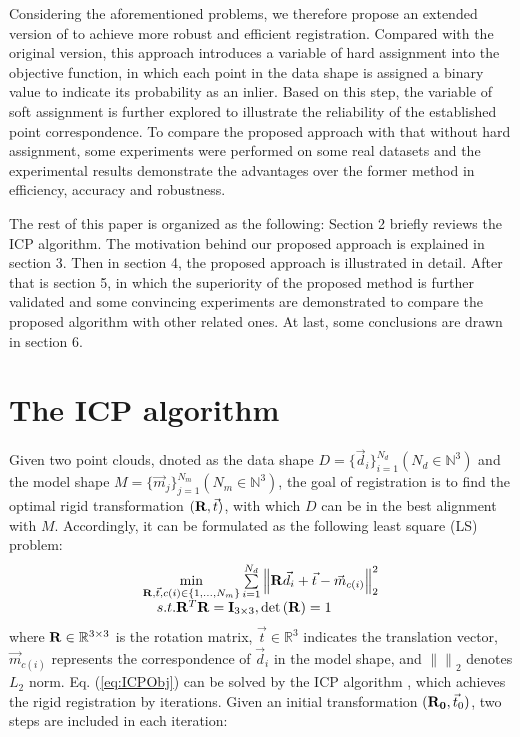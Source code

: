 \documentclass[review]{elsarticle}
\begin{document}
Considering the aforementioned problems, we therefore propose an extended version of \cite{Zhu16} to achieve more robust and efficient registration. Compared with the original version, this approach introduces a variable of hard assignment into the objective function, in which each point in the data shape is assigned a binary value to indicate its probability as an inlier. Based on this step, the variable of soft assignment is further explored to illustrate the reliability of the established point correspondence. To compare the proposed approach with that without hard assignment, some experiments were performed on some real datasets and the experimental results demonstrate the advantages over the former method in efficiency, accuracy and robustness.

The rest of this paper is organized as the following: Section 2 briefly reviews the ICP algorithm. The motivation behind our proposed approach is explained in section 3.
Then in section 4, the proposed approach is illustrated in detail. After that is section 5, in which the superiority of the proposed method is further validated and some convincing experiments are demonstrated to compare the proposed algorithm with other related ones. At last, some conclusions are drawn in section 6.


\section{The ICP algorithm}

Given two point clouds, dnoted as the data shape $D =\{ {\vec d_i}\} _{i = 1}^{{N_d}}({N_d}\in{\mathbb{N}^3})$ and the model shape $M =\{ {\vec m_j}\} _{j = 1}^{{N_m}}({N_m}\in{\mathbb{N}^3})$, the goal of registration is to find the optimal rigid transformation $({\bf{R}},\vec t)$, with which $D$ can be in the best alignment with $M$. Accordingly, it can be formulated as the following least square (LS) problem:
\begin{equation}
\begin{array}{l}
\mathop {\min }\limits_{{\bf{R}},\vec t ,c\left( i \right) \in \left\{ {1, \ldots ,{N_m}} \right\}} \sum\limits_{i = 1}^{{N_d}} {\left\| {{\bf{R}}{{\vec d }_i} + \vec t  - {{\vec m }_{c\left( i \right)}}} \right\|} _2^2\\
\quad s.t.{{\bf{R}}^T}{\bf{R}} = {{\bf{I}}_{3 \times 3}},\det \left( {\bf{R}} \right) = 1
\end{array}
\label{eq:ICPObj}
\end{equation}
where ${\bf{R}} \in \mathbb{R}^{3\times 3}$ is the rotation matrix, $\vec t \in {\mathbb{R}^3}$ indicates the translation vector, ${\vec m_{c(i)}}$ represents the correspondence of ${\vec d_i}$ in the model shape, and ${\left\| \right\|}_2$ denotes $L_2$ norm. Eq. (\ref{eq:ICPObj}) can be solved by the ICP algorithm \cite{Besl92}, which achieves the rigid registration by iterations. Given an initial transformation $({\bf{R}_0},{\vec t_0})$, two steps are included in each iteration:
\end{document}
